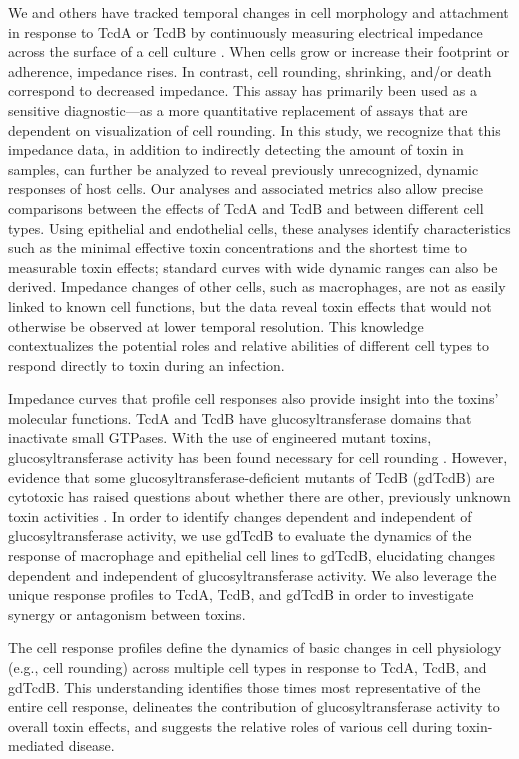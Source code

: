 We and others have tracked temporal changes in cell 
morphology and attachment in response to TcdA or TcdB 
by continuously measuring electrical impedance across 
the surface of a cell culture \cite{He:2009hg,Ryder:2010jo,DAuria:2013jo}. When cells 
grow or increase their footprint or adherence, impedance 
rises. In contrast, cell rounding, shrinking, and/or 
death correspond to decreased impedance. This assay 
has primarily been used as a sensitive diagnostic—as 
a more quantitative replacement of assays that are 
dependent on visualization of cell rounding. In 
this study, we recognize that this impedance data, 
in addition to indirectly detecting the amount of toxin 
in samples, can further be analyzed to reveal previously 
unrecognized, dynamic responses of host cells. Our analyses 
and associated metrics also allow precise comparisons 
between the effects of TcdA and TcdB and between different 
cell types. Using epithelial and endothelial cells, 
these analyses identify characteristics such as the minimal 
effective toxin concentrations and the shortest time to 
measurable toxin effects; standard curves with wide 
dynamic ranges can also be derived. Impedance changes 
of other cells, such as macrophages, are not as easily 
linked to known cell functions, but the data reveal toxin 
effects that would not otherwise be observed at lower 
temporal resolution. This knowledge contextualizes the 
potential roles and relative abilities of different cell 
types to respond directly to toxin during an infection. 

Impedance curves that profile cell responses also provide 
insight into the toxins' molecular functions. TcdA and 
TcdB have glucosyltransferase domains that inactivate small 
GTPases. With the use of engineered mutant toxins, 
glucosyltransferase activity has been found necessary 
for cell rounding \cite{Teichert:2006jo}. However, evidence that some 
glucosyltransferase-deficient mutants of TcdB (gdTcdB) 
are cytotoxic has raised questions about whether there 
are other, previously unknown toxin activities \cite{Chumbler:2012co}. In 
order to identify changes dependent and independent of 
glucosyltransferase activity, we use gdTcdB to evaluate 
the dynamics of the response of macrophage and epithelial 
cell lines to gdTcdB, elucidating changes dependent and 
independent of glucosyltransferase activity. We also 
leverage the unique response profiles to TcdA, TcdB, 
and gdTcdB in order to investigate synergy or antagonism 
between toxins.

The cell response profiles define the dynamics of basic 
changes in cell physiology (e.g., cell rounding) across 
multiple cell types in response to TcdA, TcdB, and gdTcdB. 
This understanding identifies those times most representative 
of the entire cell response, delineates the contribution 
of glucosyltransferase activity to overall toxin effects, 
and suggests the relative roles of various cell during 
toxin-mediated disease.


